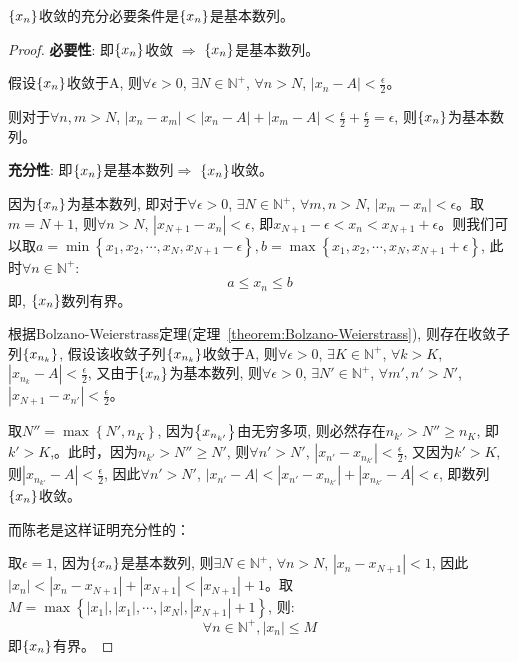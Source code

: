 \begin{theorem}[Cauchy收敛原理]
    $\left\{ x_n\right\}$收敛的充分必要条件是$\left\{ x_n\right\}$是基本数列。
\end{theorem}
\begin{proof}
{\bf 必要性}: 即$\left\{ x_n\right\}$收敛 $\Rightarrow$ $\left\{ x_n\right\}$是基本数列。

假设$\left\{ x_n\right\}$收敛于A, 则$\forall \epsilon > 0$, $\exists N \in \mathbb{N}^+$, $\forall n > N$, $\left| x_n - A \right| < \frac{\epsilon}{2}$。

则对于$\forall n, m > N$, $\left| x_n - x_m \right| < \left| x_n - A \right| + \left| x_m - A \right| < \frac{\epsilon}{2} + \frac{\epsilon}{2} = \epsilon $, 则$\left\{ x_n\right\}$为基本数列。

{\bf 充分性}: 即$\left\{ x_n\right\}$是基本数列$\Rightarrow$ $\left\{ x_n\right\}$收敛。

因为$\left\{ x_n\right\}$为基本数列, 即对于$\forall \epsilon > 0$, $\exists N \in \mathbb{N}^+$, $\forall m, n > N$, $\left| x_m - x_n \right| < \epsilon$。取$m = N + 1$, 则$\forall n > N$, $\left| x_{N+1} - x_n \right| < \epsilon$, 即$x_{N+1} -\epsilon < x_n < x_{N+1} + \epsilon $。则我们可以取$a = \min\left\{ x_1, x_2, \cdots, x_N, x_{N+1} - \epsilon \right\}, b = \max\left\{ x_1, x_2, \cdots, x_N, x_{N+1} + \epsilon \right\}$, 此时$\forall n \in \mathbb{N}^+$:
\[ a \le x_n \le b\]
即, $\left\{ x_n\right\}$数列有界。

根据Bolzano-Weierstrass定理(定理~\ref{theorem:Bolzano-Weierstrass}), 则存在收敛子列$\left\{ x_{n_k}\right\}$, 假设该收敛子列$\left\{ x_{n_k}\right\}$收敛于A, 则$\forall \epsilon > 0$, $\exists K \in \mathbb{N}^+$, $\forall k > K$, $\left| x_{n_k} - A \right| < \frac{\epsilon}{2}$, 又由于$\left\{ x_n\right\}$为基本数列, 则$\forall \epsilon > 0$, $\exists N' \in \mathbb{N}^+$, $\forall m', n' > N'$, $\left| x_{N+1} - x_{n'} \right| < \frac{\epsilon}{2}$。

取$N'' = \max\left\{N', n_K\right\}$, 因为$\left\{ x_{n_{k'}}\right\}$由无穷多项, 则必然存在$n_{k'} > N'' \ge n_K$, 即$k' > K$,。此时，因为$n_{k'} > N'' \ge N'$, 则$\forall n' > N'$, $\left| x_{n'} - x_{n_{k'}}\right| < \frac{\epsilon}{2}$, 又因为$k' > K$, 则$\left| x_{n_{k'}} - A\right| < \frac{\epsilon}{2}$, 因此$\forall n' > N'$, $\left| x_{n'} - A \right| < \left| x_{n'} - x_{n_{k'}} \right| + \left| x_{n_{k'}} - A \right| < \epsilon $, 即数列$\left\{ x_n\right\}$收敛。

而陈老是这样证明充分性的：

取$\epsilon = 1$, 因为$\left\{ x_n\right\}$是基本数列, 则$\exists N \in \mathbb{N}^+$, $\forall n > N$, $\left| x_n - x_{N+1} \right| < 1$, 因此$\left| x_n \right| < \left| x_n - x_{N+1} \right| + \left| x_{N+1} \right| < \left| x_{N+1} \right| + 1$。取$M = \max\left\{\left| x_1 \right|,\left| x_1 \right|,\cdots,\left| x_{N} \right|, \left| x_{N+1} \right| + 1\right\}
$, 则:
\[ \forall n \in \mathbb{N}^+, \left| x_n \right| \le M \]
即$\left\{ x_n\right\}$有界。


\end{proof}
